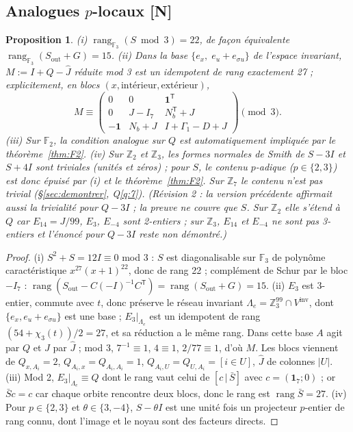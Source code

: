 \documentclass[11pt,a4paper]{article}
\newtheorem{proposition}[theorem]{Proposition}
\theoremstyle{definition}
\theoremstyle{remark}
\newcommand{\F}{\mathbb{F}}
\newcommand{\Z}{\mathbb{Z}}
\newcommand{\rg}{\operatorname{rang}}
\newcommand{\Sout}{S_{\mathrm{out}}}
\newcommand{\st}[1]{\textbf{[#1]}}
\begin{document}
\subsection{Analogues $p$-locaux \st{N}}
\begin{proposition}\label{prop:F3}
(i) $\rg_{\F_3}(S\bmod3)=22$, de façon équivalente $\rg_{\F_3}(\Sout+G)=15$.
(ii) Dans la base $\{e_x,\;e_u+e_{\sigma u}\}$ de l'espace invariant, $M:=I+Q-\hat J$ réduite mod 3 est un idempotent de rang exactement 27 ; explicitement, en blocs $(x,\text{intérieur},\text{extérieur})$,
\[M\equiv\begin{pmatrix}0&0&\mathbf 1^{\mathsf T}\\ 0&J-I_7&N_b^{\mathsf T}+J\\ -\mathbf 1&N_b+J&I+\Gamma_1-D+J\end{pmatrix}\pmod 3 .\]
(iii) Sur $\F_2$, la condition analogue sur $Q$ est automatiquement impliquée par le théorème~\ref{thm:F2}.
(iv) Sur $\Z_2$ et $\Z_3$, les formes normales de Smith de $S-3I$ et $S+4I$ sont triviales (unités et zéros) ; pour $S$, le contenu $p$-adique ($p\in\{2,3\}$) est donc épuisé par (i) et le théorème~\ref{thm:F2}. Sur $\Z_7$ le contenu n'est pas trivial (§\ref{sec:demontrer}, Q\ref{q:7}).
\emph{(Révision 2 : la version précédente affirmait aussi la trivialité pour $Q-3I$ ; la preuve ne couvre que $S$. Sur $\Z_2$ elle s'étend à $Q$ car $E_{14}=J/99$, $E_3$, $E_{-4}$ sont 2-entiers ; sur $\Z_3$, $E_{14}$ et $E_{-4}$ ne sont pas 3-entiers et l'énoncé pour $Q-3I$ reste non démontré.)}
\end{proposition}
\begin{proof}
(i) $S^2+S=12I\equiv0$ mod 3 : $S$ est diagonalisable sur $\F_3$ de polynôme caractéristique $x^{27}(x+1)^{22}$, donc de rang 22 ; complément de Schur par le bloc $-I_7$ : $\rg(\Sout-C(-I)^{-1}C^{\mathsf T})=\rg(\Sout+G)=15$.
(ii) $E_3$ est 3-entier, commute avec $t$, donc préserve le réseau invariant $\Lambda_e=\Z_3^{99}\cap V^{\mathrm{inv}}$, dont $\{e_x,e_u+e_{\sigma u}\}$ est une base ; $E_3|_{\Lambda_e}$ est un idempotent de rang $(54+\chi_3(t))/2=27$, et sa réduction a le même rang. Dans cette base $A$ agit par $Q$ et $J$ par $\hat J$ ; mod 3, $7^{-1}\equiv1$, $4\equiv1$, $2/77\equiv1$, d'où $M$. Les blocs viennent de $Q_{x,A_i}=2$, $Q_{A_i,x}=Q_{A_i,A_i}=1$, $Q_{A_i,U}=Q_{U,A_i}=[i\in U]$, $\hat J$ de colonnes $|U|$.
(iii) Mod 2, $E_3|_{\Lambda_e}\equiv Q$ dont le rang vaut celui de $[c\,|\,\bar S]$ avec $c=(\mathbf 1_7;0)$ ; or $\bar S c=c$ car chaque orbite rencontre deux blocs, donc le rang est $\rg\bar S=27$.
(iv) Pour $p\in\{2,3\}$ et $\theta\in\{3,-4\}$, $S-\theta I$ est une unité fois un projecteur $p$-entier de rang connu, dont l'image et le noyau sont des facteurs directs.
\end{proof}
\end{document}
